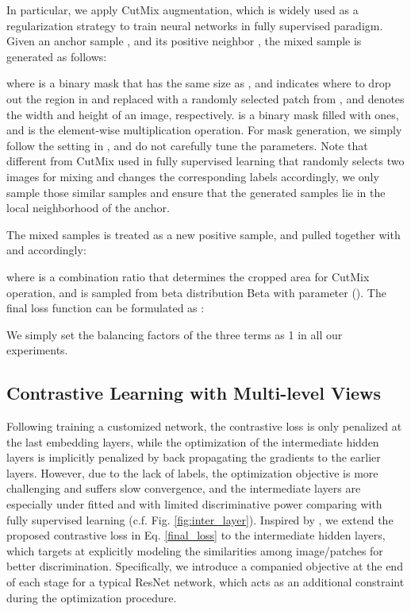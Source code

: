 \documentclass[10pt,twocolumn,letterpaper]{article}
\begin{document}
In particular, we apply CutMix \cite{yun2019cutmix} augmentation, which is widely used as a regularization strategy to train neural networks in fully supervised paradigm. Given an anchor sample , and its positive neighbor , the mixed sample  is generated as follows:

where  is a binary mask that has the same size as , and indicates where to drop out the region in  and replaced with a randomly selected patch from , and  denotes the width and height of an image, respectively.  is a binary mask filled with ones, and  is the element-wise multiplication operation. For mask  generation, we simply follow the setting in \cite{yun2019cutmix}, and do not carefully tune the parameters. Note that different from CutMix used in fully supervised learning that randomly selects two images for mixing and changes the corresponding labels accordingly, we only sample those similar samples and ensure that the generated samples lie in the local neighborhood of the anchor.


The mixed samples  is treated as a new positive sample, and pulled together with  and  accordingly:


where  is a combination ratio that determines the cropped area for CutMix operation, and is sampled from beta distribution Beta with parameter  (). The final loss function can be formulated as :



We simply set the balancing factors of the three terms as 1 in all our experiments.





\subsection{Contrastive Learning with Multi-level Views}
Following training a customized network, the contrastive loss is only penalized at the last embedding layers, while the optimization of the intermediate hidden layers is implicitly penalized by back propagating the gradients to the earlier layers. However, due to the lack of labels, the optimization objective is more challenging and suffers slow convergence, and the intermediate layers are especially under fitted and with limited discriminative power comparing with fully supervised learning (c.f. Fig. \ref{fig:inter_layer}). Inspired by \cite{lee2015deeply}, we extend the proposed contrastive loss in Eq. \ref{final_loss} to the intermediate hidden layers, which targets at explicitly modeling the similarities among image/patches for better discrimination. Specifically, we introduce a companied objective at the end of each stage for a typical ResNet network, which acts as an additional constraint during the optimization procedure.
\end{document}
